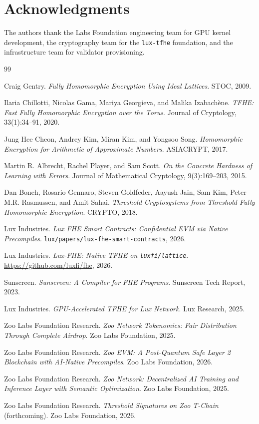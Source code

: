 \section*{Acknowledgments}

The authors thank the \Zoo{} Labs Foundation engineering team for GPU kernel development, the \Lux{} cryptography team for the \texttt{lux-tfhe} foundation, and the \Hanzo{} infrastructure team for validator provisioning.

\begin{thebibliography}{99}

Craig Gentry.
\textit{Fully Homomorphic Encryption Using Ideal Lattices}.
STOC, 2009.

Ilaria Chillotti, Nicolas Gama, Mariya Georgieva, and Malika Izabach\`{e}ne.
\textit{TFHE: Fast Fully Homomorphic Encryption over the Torus}.
Journal of Cryptology, 33(1):34--91, 2020.

Jung Hee Cheon, Andrey Kim, Miran Kim, and Yongsoo Song.
\textit{Homomorphic Encryption for Arithmetic of Approximate Numbers}.
ASIACRYPT, 2017.

Martin R. Albrecht, Rachel Player, and Sam Scott.
\textit{On the Concrete Hardness of Learning with Errors}.
Journal of Mathematical Cryptology, 9(3):169--203, 2015.

Dan Boneh, Rosario Gennaro, Steven Goldfeder, Aayush Jain, Sam Kim, Peter M.R. Rasmussen, and Amit Sahai.
\textit{Threshold Cryptosystems from Threshold Fully Homomorphic Encryption}.
CRYPTO, 2018.

Lux Industries.
\textit{Lux FHE Smart Contracts: Confidential EVM via Native Precompiles}.
\texttt{lux/papers/lux-fhe-smart-contracts}, 2026.

Lux Industries.
\textit{Lux-FHE: Native TFHE on \texttt{luxfi/lattice}}.
\url{https://github.com/luxfi/fhe}, 2026.

Sunscreen.
\textit{Sunscreen: A Compiler for FHE Programs}.
Sunscreen Tech Report, 2023.

Lux Industries.
\textit{GPU-Accelerated TFHE for Lux Network}.
Lux Research, 2025.

Zoo Labs Foundation Research.
\textit{Zoo Network Tokenomics: Fair Distribution Through Complete Airdrop}.
Zoo Labs Foundation, 2025.

Zoo Labs Foundation Research.
\textit{Zoo EVM: A Post-Quantum Safe Layer 2 Blockchain with AI-Native Precompiles}.
Zoo Labs Foundation, 2026.

Zoo Labs Foundation Research.
\textit{Zoo Network: Decentralized AI Training and Inference Layer with Semantic Optimization}.
Zoo Labs Foundation, 2025.

Zoo Labs Foundation Research.
\textit{Threshold Signatures on Zoo T-Chain} (forthcoming).
Zoo Labs Foundation, 2026.

\end{thebibliography}

